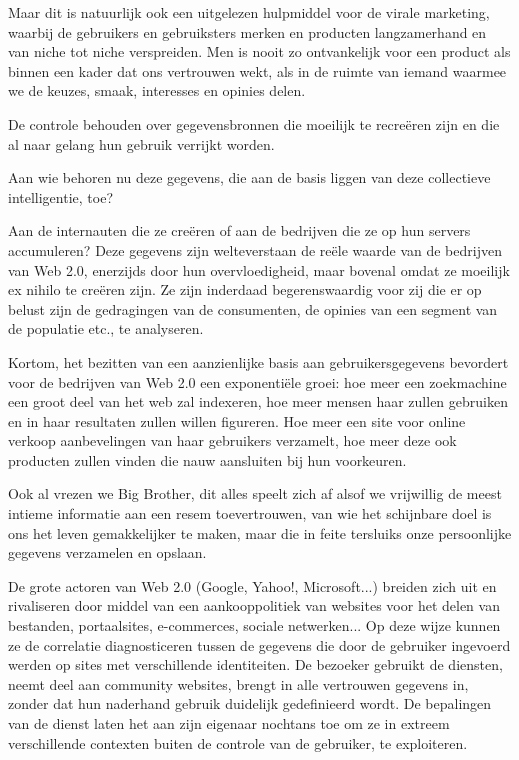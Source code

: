 {Maar dit is natuurlijk ook een uitgelezen hulpmiddel voor de virale
marketing, waarbij de gebruikers en gebruiksters merken en producten
langzamerhand en van niche tot niche verspreiden. Men is nooit zo
ontvankelijk voor een product als binnen een kader dat ons vertrouwen
wekt, als in de ruimte van iemand waarmee we de keuzes, smaak,
interesses en opinies delen.

De controle behouden over gegevensbronnen die moeilijk te recre\"eren
zijn en die al naar gelang hun gebruik verrijkt worden. 

Aan wie behoren nu deze gegevens, die aan de basis liggen van deze
collectieve intelligentie, toe? 

Aan de internauten die ze cre\"eren of aan de bedrijven die ze op hun
servers accumuleren? Deze gegevens zijn welteverstaan de re\"ele waarde
van de bedrijven van Web 2.0, enerzijds door hun overvloedigheid, maar
bovenal omdat ze moeilijk ex nihilo te cre\"eren zijn. Ze zijn
inderdaad begerenswaardig voor zij die er op belust zijn de gedragingen
van de consumenten, de opinies van een segment van de populatie etc.,
te analyseren. 

Kortom, het bezitten van een aanzienlijke basis aan gebruikersgegevens
bevordert voor de bedrijven van Web 2.0 een exponenti\"ele groei: hoe
meer een zoekmachine een groot deel van het web zal indexeren, hoe meer
mensen haar zullen gebruiken en in haar resultaten zullen willen
figureren. Hoe meer een site voor online verkoop aanbevelingen van haar
gebruikers verzamelt, hoe meer deze ook producten zullen vinden die
nauw aansluiten bij hun voorkeuren.

Ook al vrezen we Big Brother, dit alles speelt zich af alsof we
vrijwillig de meest intieme informatie aan een resem 
toevertrouwen, van wie het schijnbare doel is ons het leven
gemakkelijker te maken, maar die in feite tersluiks onze persoonlijke
gegevens verzamelen en opslaan.

De grote actoren van Web 2.0 (Google, Yahoo!, Microsoft...) breiden
zich uit en rivaliseren door middel van een aankooppolitiek van
websites voor het delen van bestanden, portaalsites, e{}-commerces,
sociale netwerken... Op deze wijze kunnen ze de correlatie
diagnosticeren tussen de gegevens die door de gebruiker ingevoerd
werden op sites met verschillende identiteiten. De bezoeker gebruikt de
diensten, neemt deel aan community websites, brengt in alle vertrouwen
gegevens in, zonder dat hun naderhand gebruik duidelijk gedefinieerd
wordt. De bepalingen van de dienst laten het aan zijn eigenaar nochtans
toe om ze in extreem verschillende contexten buiten de controle van de
gebruiker, te exploiteren.

}
